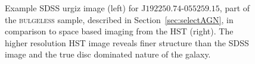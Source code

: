 \begin{figure}[h]
\caption[Example HST image data in comparison to SDSS]{Example SDSS urgiz image (left) for J$192250.74$-$055259.15$, part of the \textsc{bulgeless} sample, described in Section~\ref{sec:selectAGN}, in comparison to space based imaging from the HST (right). The higher resolution HST image reveals finer structure than the SDSS image and the true disc dominated nature of the galaxy.}
\label{gal}
\end{figure}
